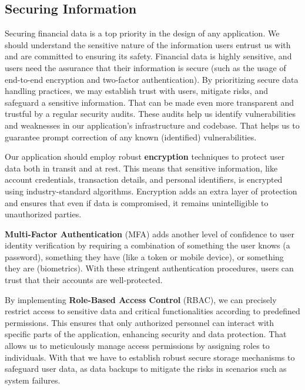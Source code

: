 \subsection{Securing Information}

Securing financial data is a top priority in the design of any application. We should understand the sensitive nature 
of the information users entrust us with and are committed to ensuring its safety. Financial data is highly sensitive, 
and users need the assurance that their information is secure (such as the usage of end-to-end encryption and 
two-factor authentication). By prioritizing secure data handling practices, we may establish trust with users, mitigate 
risks, and safeguard a sensitive information. That can be made even more transparent and trustful by a regular security 
audits. These audits help us identify vulnerabilities and weaknesses in our application's infrastructure and codebase. 
That helps us to guarantee prompt correction of any known (identified) vulnerabilities.

Our application should employ robust \textbf{encryption} techniques to protect user data both in transit and at rest. 
This means that sensitive information, like account credentials, transaction details, and personal identifiers, is 
encrypted using industry-standard algorithms. Encryption adds an extra layer of protection and ensures that even if 
data is compromised, it remains unintelligible to unauthorized parties.

\textbf{Multi-Factor Authentication} (MFA) adds another level of confidence to user identity verification by requiring
a combination of something the user knows (a password), something they have (like a token or mobile device), or 
something they are (biometrics). With these stringent authentication procedures, users can trust that their accounts 
are well-protected. 

By implementing \textbf{Role-Based Access Control} (RBAC), we can precisely restrict access to sensitive data and critical 
functionalities according to predefined permissions. This ensures that only authorized personnel can interact with 
specific parts of the application, enhancing security and data protection. That allows us to meticulously manage access 
permissions by assigning roles to individuals. With that we have to establish robust secure storage mechanisms to 
safeguard user data, as data backups to mitigate the risks in scenarios such as system failures.

